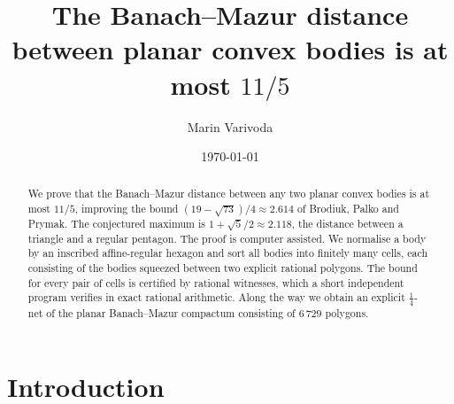 \documentclass[11pt]{amsart}
\theoremstyle{definition}
\theoremstyle{remark}
\begin{document}
\title{The Banach--Mazur distance between planar convex bodies is at most $11/5$}
\author{Marin Varivoda}
\address{Department of Mathematics, Faculty of Science, University of Zagreb, Bijeni\v{c}ka cesta 30, 10000 Zagreb, Croatia}
\date{\today}

\begin{abstract}
We prove that the Banach--Mazur distance between any two planar convex bodies is at most
$11/5$, improving the bound $(19-\sqrt{73})/4\approx 2.614$ of Brodiuk, Palko and Prymak.
The conjectured maximum is $1+\sqrt5/2\approx2.118$, the distance between a triangle and a
regular pentagon. The proof is computer assisted. We normalise a body by an inscribed affine-regular
hexagon and sort all bodies into finitely many cells, each consisting of the bodies squeezed between two
explicit rational polygons. The bound for every pair of cells is certified by rational witnesses,
which a short independent program verifies in exact rational arithmetic. Along the way we obtain an
explicit $\frac14$-net of the planar Banach--Mazur compactum consisting of $6\,729$ polygons.
\end{abstract}

\maketitle

\section{Introduction}
\end{document}
